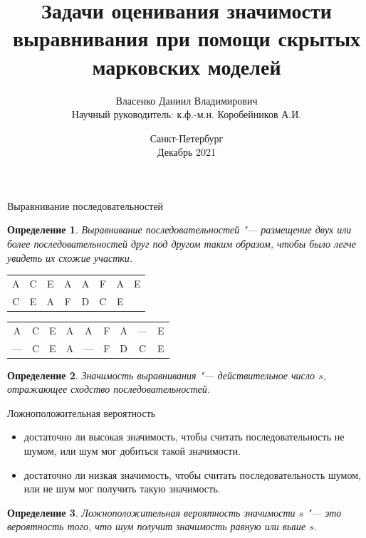 \documentclass{beamer}
\title[Оценивание значимости выравнивания]{Задачи оценивания значимости выравнивания при помощи скрытых марковских моделей}
\author[Власенко Даниил]{Власенко Даниил Владимирович \\ Научный руководитель: к.ф.-м.н. Коробейников А.И.}
\date[Декабрь 2021]{Санкт-Петербург\\Декабрь 2021}
\institute[]{Санкт-Петербургский государственный университет\\ Кафедра "Статистического моделирования"}
\newtheorem{defenition}{Определение}
\begin{document}
	\begin{frame}
		\titlepage
	\end{frame}

	\begin{frame}{Выравнивание последовательностей}
		\begin{defenition}
			Выравнивание последовательностей  "--- размещение двух или более последовательностей друг под другом таким образом, чтобы было легче увидеть их схожие участки.
		\end{defenition}
	
		\begin{center}
			\begin{tabular}{cccccccc}
				A&C&E&A&A&F&A&E\\
				C&E&A&F&D&C&E&\\
			\end{tabular}
		\end{center}
		\begin{center}
			\begin{tabular}{ccccccccc}
				A&C&E&A&A&F&A&—&E\\
				—&C&E&A&—&F&D&C&E\\
			\end{tabular}
		\end{center}
	
		\begin{defenition}
			Значимость выравнивания "--- действительное число $s$, отражающее сходство последовательностей.
		\end{defenition}
	\end{frame}

	\begin{frame}{Ложноположительная вероятность}
		\begin{itemize}
			\item достаточно ли высокая значимость, чтобы считать последовательность не шумом, или шум мог добиться такой значимости.
			\item достаточно ли низкая значимость, чтобы считать последовательность шумом, или не шум мог получить такую значимость. 
		\end{itemize}
	
		\begin{defenition}
			Ложноположительная вероятность значимости $s$ "--- это вероятность того, что шум получит значимость равную или выше $s$. 
		\end{defenition}
	\end{frame}
\end{document}
